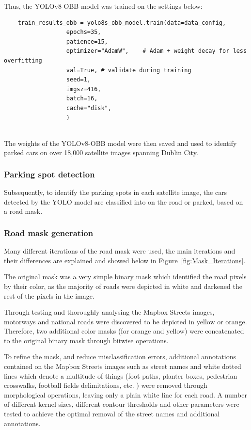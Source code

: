 Thus, the YOLOv8-OBB model was trained on the settings below:
\begin{listing}[h!]
  \centering
  \begin{verbatim}
    train_results_obb = yolo8s_obb_model.train(data=data_config,
                  epochs=35,
                  patience=15,
                  optimizer="AdamW",    # Adam + weight decay for less overfitting
                  val=True, # validate during training
                  seed=1,
                  imgsz=416,
                  batch=16,
                  cache="disk",
                  )
  \end{verbatim}
\end{listing}\\

The weights of the YOLOv8-OBB model were then saved and used to identify parked cars on over 18,000 satellite images spanning Dublin City.

\newpage
\subsubsection{Parking spot detection}
Subsequently, to identify the parking spots in each satellite image, the cars detected by the YOLO model are classified into on the road or parked, based on a road mask.

\subsubsection{Road mask generation} \label{sec:road_mask_generation}
Many different iterations of the road mask were used, the main iterations and their differences are explained and showed below in Figure~\ref{fig:Mask_Iterations}.

The original mask was a very simple binary mask which identified the road pixels by their color, as the majority of roads were depicted in white and darkened the rest of the pixels in the image.

Through testing and thoroughly analysing the Mapbox Streets images, motorways and national roads were discovered to be depicted in yellow or orange. Therefore, two additional color masks (for orange and yellow) were concatenated to the original binary mask through bitwise operations.

To refine the mask, and reduce misclassification errors, additional annotations contained on the Mapbox Streets images such as street names and white dotted lines which denote a multitude of things (foot paths, planter boxes, pedestrian crosswalks, football fields delimitations, etc. ) were removed through morphological operations, leaving only a plain white line for each road.
A number of different kernel sizes, different contour thresholds and other parameters were tested to achieve the optimal removal of the street names and additional annotations.

